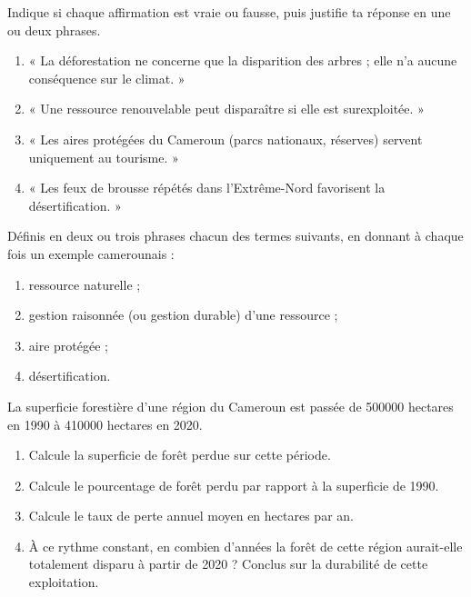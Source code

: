 \documentclass[11pt]{article}
\newcommand{\cle}[1]{{\popxbold\color{popdark}#1}}
\begin{document}
\begin{exercice}
Indique si chaque affirmation est vraie ou fausse, puis justifie ta réponse en une ou deux phrases.
\begin{enumerate}
\item « La déforestation ne concerne que la disparition des arbres ; elle n'a aucune conséquence sur le climat. »
\item « Une ressource renouvelable peut disparaître si elle est surexploitée. »
\item « Les aires protégées du Cameroun (parcs nationaux, réserves) servent uniquement au tourisme. »
\item « Les feux de brousse répétés dans l'Extrême-Nord favorisent la désertification. »
\end{enumerate}
\end{exercice}

\begin{exercice}[Définitions]
Définis en deux ou trois phrases chacun des termes suivants, en donnant à chaque fois un exemple camerounais :
\begin{enumerate}
\item \cle{ressource naturelle} ;
\item \cle{gestion raisonnée} (ou \cle{gestion durable}) d'une ressource ;
\item \cle{aire protégée} ;
\item \cle{désertification}.
\end{enumerate}
\end{exercice}

\begin{exercice}
La superficie forestière d'une région du Cameroun est passée de \num{500000} hectares en 1990 à \num{410000} hectares en 2020.
\begin{enumerate}
\item Calcule la superficie de forêt perdue sur cette période.
\item Calcule le pourcentage de forêt perdu par rapport à la superficie de 1990.
\item Calcule le taux de perte annuel moyen en hectares par an.
\item À ce rythme constant, en combien d'années la forêt de cette région aurait-elle totalement disparu à partir de 2020 ? Conclus sur la durabilité de cette exploitation.
\end{enumerate}
\end{exercice}
\end{document}
